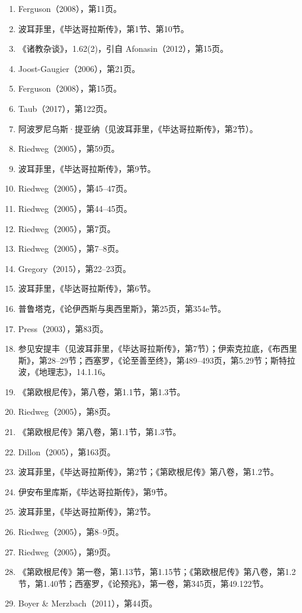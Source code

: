 \begin{enumerate}
\item Ferguson（2008），第11页。  
\item 波耳菲里，《毕达哥拉斯传》，第1节、第10节。  
\item 《诸教杂谈》，1.62(2)，引自 Afonasin（2012），第15页。
\item Joost-Gaugier（2006），第21页。  
\item Ferguson（2008），第15页。  
\item Taub（2017），第122页。  
\item 阿波罗尼乌斯·提亚纳（见波耳菲里，《毕达哥拉斯传》，第2节）。  
\item Riedweg（2005），第59页。  
\item 波耳菲里，《毕达哥拉斯传》，第9节。  
\item Riedweg（2005），第45–47页。  
\item Riedweg（2005），第44–45页。  
\item Riedweg（2005），第7页。  
\item Riedweg（2005），第7–8页。  
\item Gregory（2015），第22–23页。  
\item 波耳菲里，《毕达哥拉斯传》，第6节。  
\item 普鲁塔克，《论伊西斯与奥西里斯》，第25页，第354e节。  
\item Press（2003），第83页。  
\item 参见安提丰（见波耳菲里，《毕达哥拉斯传》，第7节）；伊索克拉底，《布西里斯》，第28–29节；西塞罗，《论至善至终》，第489–493页，第5.29节；斯特拉波，《地理志》，14.1.16。  
\item 《第欧根尼传》，第八卷，第1.1节，第1.3节。  
\item Riedweg（2005），第8页。  
\item 《第欧根尼传》第八卷，第1.1节，第1.3节。  
\item Dillon（2005），第163页。  
\item 波耳菲里，《毕达哥拉斯传》，第2节；《第欧根尼传》第八卷，第1.2节。  
\item 伊安布里库斯，《毕达哥拉斯传》，第9节。  
\item 波耳菲里，《毕达哥拉斯传》，第2节。  
\item Riedweg（2005），第8–9页。  
\item Riedweg（2005），第9页。  
\item 《第欧根尼传》第一卷，第1.13节，第1.15节；《第欧根尼传》第八卷，第1.2节，第1.40节；西塞罗，《论预兆》，第一卷，第345页，第49.122节。  
\item Boyer & Merzbach（2011），第44页。  

\end{enumerate}
